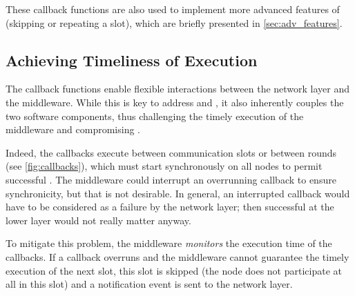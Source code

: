 These callback functions are also used to implement more advanced features of \baloo (\eg skipping or repeating a slot), which are briefly presented in \cref{sec:adv_features}.



\subsection{Achieving Timeliness of Execution}
\label{subsec:timeliness}

The callback functions enable flexible interactions between the network layer and the middleware. While this is key to address  and , it also inherently couples the two software components, thus challenging the timely execution of the middleware and compromising .

Indeed, the callbacks execute between communication slots or between rounds (see \cref{fig:callbacks}), which must start synchronously on all nodes to permit successful \ST.
The middleware could interrupt an overrunning callback to ensure synchronicity, but that is not desirable. In general, an interrupted callback would have to be considered as a failure by the network layer; then successful \ST at the lower layer would not really matter anyway.

To mitigate this problem, the middleware \textsl{monitors} the execution time of the callbacks. If a callback overruns and the middleware cannot guarantee the timely execution of the next slot, this slot is skipped (\ie the node does not participate at all in this slot) and a notification event is sent to the network layer.

